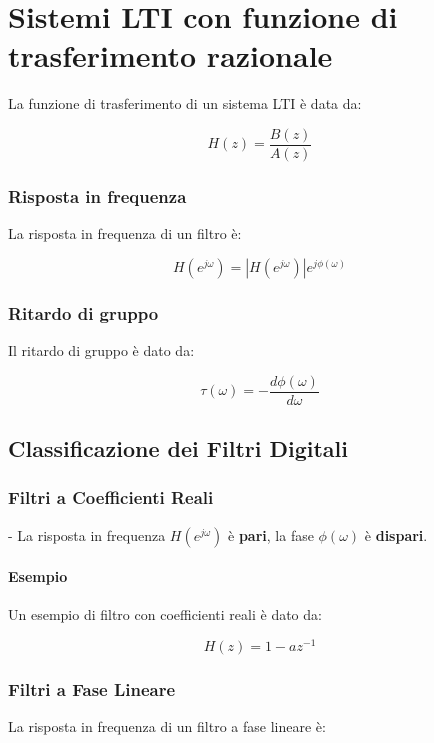 
\chapter{Sistemi LTI con funzione di trasferimento razionale}

La funzione di trasferimento di un sistema LTI è data da:

\[
H(z) = \frac{B(z)}{A(z)}
\]

\subsection*{Risposta in frequenza}

La risposta in frequenza di un filtro è:

\[
H(e^{j\omega}) = |H(e^{j\omega})| e^{j\phi(\omega)}
\]

\subsection*{Ritardo di gruppo}

Il ritardo di gruppo è dato da:

\[
\tau(\omega) = -\frac{d\phi(\omega)}{d\omega}
\]

\section{Classificazione dei Filtri Digitali}

\subsection*{Filtri a Coefficienti Reali}

- La risposta in frequenza \( H(e^{j\omega}) \) è \textbf{pari}, la fase \( \phi(\omega) \) è \textbf{dispari}.

\subsubsection*{Esempio}

Un esempio di filtro con coefficienti reali è dato da:

\[
H(z) = 1 - a z^{-1}
\]

\subsection*{Filtri a Fase Lineare}

La risposta in frequenza di un filtro a fase lineare è:

